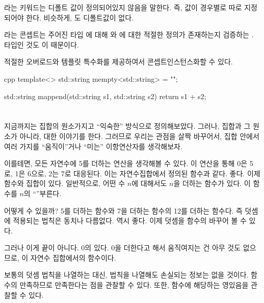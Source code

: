 라는 키워드는 디폴트 값이 정의되어있지 않음을 말한다. 
즉, 값이 경우별로 따로 지정되어야 한다.
비슷하게, 도 디폴트값이 없다.

라는 콘셉트는
주어진 타입 에 대해 와 에 대한 적절한 정의가 존재하는지 검증하는 .
 타입인 것도 이 때문이다.

적절한 오버로드와 템플릿 특수화를 제공하여서 \trMonoid 콘셉트\를 인스턴스화할 수 있다.

\begin{snip}{cpp}
template<>
std::string mempty<std::string> = {""};

std::string mappend(std::string s1, std::string s2) { 
    return s1 + s2;
}
\end{snip}

\section{\trCategory{} \trMonoid }

지금까지는 집합의 원소\를 가지고 ``익숙한'' 방식으로 \trMonoid\를 정의해보았다. 
그러나,  집합과 그 원소가 아니라, \trObject\와  대한 이야기를 한다.
그러므로 우리는 관점을 살짝 바꾸어서, 집합 안에서 여러 가지를 ``움직이''거나 ``미는'' 이항연산자를 생각해보자.

이를테면, 모든 자연수에 5를 더하는 연산을 생각해볼 수 있다. 이 연산을 통해 0은 5로, 1은 6으로, 2는 7로 대응된다.
이는 자연수집합에서 정의된 함수과 같다. 좋다. 이제 함수와 집합이 있다. 
일반적으로, 어떤 수 $n$에 대해서도 $n$을 더하는 함수가 있다. 이 함수를 $n$의 ``\trAdder'' 부른다.

\trAdder\는 어떻게  수 있을까? 5를 더하는 함수와 7을 더하는 함수의 \trComposition\은 12를 더하는 함수다.
즉  \trComposition\과 덧셈에 적용되는 법칙은 동치나 다름없다. 역시 좋다. 이제 덧셈을 함수의 \trComposition\로 바꾸어 볼 수 있다.

그러나 이게 끝이 아니다.  0의  있다. 0을 더한다고 해서 움직여지는 건 아무 것도 없으므로,
이 \trAdder\은 자연수 집합에서의 \trIdentity 함수이다.

보통의 덧셈 법칙을 나열하는 대신,  법칙을 나열해도 손실되는 정보는 없을 것이다.
함수의 \trComposition\이 \trAssociativity\를 만족하므로   \trAssociativity\을 만족한다는 점을 관찰할 수 있다.
또한, \trIdentity 함수에 해당하는 영 있음을 관찰할 수 있다.

